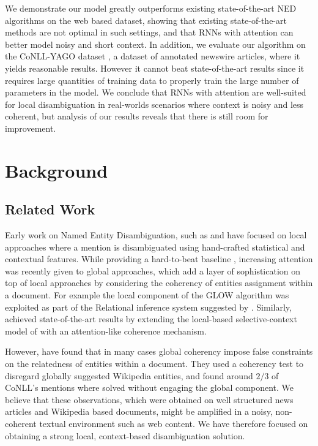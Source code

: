 \documentclass[11pt]{article}
\newcommand\toin{\todo[inline]}
\begin{document}
\toin{Noam: The next sentence sounds odd...}We demonstrate our model greatly outperforms existing state-of-the-art NED algorithms on the web based dataset, showing that existing state-of-the-art methods are not optimal in such settings, and that RNNs with attention can better model noisy and short context. In addition, we evaluate our algorithm on the CoNLL-YAGO dataset \cite{hoffart2011robust}, a dataset of annotated newswire articles, where it yields reasonable results. However it cannot beat state-of-the-art results since it requires large quantities of training data to properly train the large number of parameters in the model. We conclude that RNNs with attention are well-suited for local disambiguation in real-worlds scenarios where context is noisy and less coherent, but analysis of our results reveals that there is still room for improvement.

\section{Background}

\subsection{Related Work}

Early work on Named Entity Disambiguation, such as  and  have focused on local approaches where a mention is disambiguated using hand-crafted statistical and contextual features. While providing a hard-to-beat baseline \cite{Ratinov2011}, increasing attention was recently given to global approaches, which add a layer of sophistication on top of local approaches by considering the coherency of entities assignment within a document. For example the local component of the GLOW algorithm \cite{Ratinov2011} was exploited as part of the Relational inference system suggested by . Similarly,  achieved state-of-the-art results by extending the local-based selective-context model of  with an attention-like coherence mechanism.

However,  have found that in many cases global coherency impose false constraints on the relatedness of entities within a document. They used a coherency test to disregard globally suggested Wikipedia entities, and found around $2/3$ of CoNLL's mentions where solved without engaging the global component. We believe that these observations, which were obtained on well structured news articles and Wikipedia based documents, might be amplified in a noisy, non-coherent textual environment such as web content. We have therefore focused on obtaining a strong local, context-based disambiguation solution.
\end{document}
